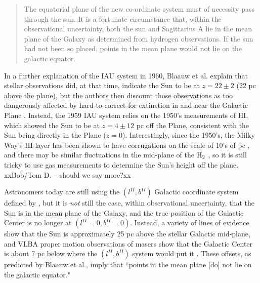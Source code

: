 \documentclass[]{article}
\begin{document}
\begin{quote}
The equatorial plane of the new co-ordinate system must of necessity
pass through the sun. It is a fortunate circumstance that, within the
observational uncertainty, both the sun and Sagittarius A lie in the
mean plane of the Galaxy as determined from hydrogen observations. If
the sun had not been so placed, points in the mean plane would not lie
on the galactic equator.

\end{quote}
In a further explanation of the IAU system in 1960, Blaauw et al.
explain that stellar observations did, at that time, indicate the Sun to
be at $z=22 \pm 2$ (22 pc above the plane), but the authors then
discount those observations as too dangerously affected by
hard-to-correct-for extinction in and near the Galactic Plane
\citep{BlaauwA.1960}. Instead, the 1959 IAU system relies on the 1950's
measurements of HI, which showed the Sun to be at $z=4\pm 12$ pc off the
Plane, consistent with the Sun being directly in the Plane ($z=0$).
Interestingly, since the 1950's, the Milky Way's HI layer has been shown
to have corrugations on the scale of 10's of pc \citep{Malhotra1995},
and there may be similar fluctuations in the mid-plane of the
${\rm H_2}$ \citep{Malhotra1994}, so it is still tricky to use gas
measurements to determine the Sun's height off the plane. xxBob/Tom D.
-- should we say more?xx

Astronomers today are still using the $(l^{II}, b^{II})$ Galactic
coordinate system defined by \citet{Blaauw1959}, but it is \emph{not}
still the case, within observational uncertainty, that the Sun is in the
mean plane of the Galaxy, and the true position of the Galactic Center
is no longer at $(l^{II}=0, b^{II}=0)$. Instead, a variety of lines of
evidence \citep{Chen2001b,Maiz-Apellaniz2001a,Juric2008a} show that the
Sun is approximately 25 pc above the stellar Galactic mid-plane, and
VLBA proper motion observations of masers show that the Galactic Center
is about 7 pc below where the $(l^{II}, b^{II})$ system would put it
\citep{Reid2004}. These offsets, as predicted by Blaauw et al., imply
that ``points in the mean plane {[}do{]} not lie on the galactic
equator."
\end{document}
